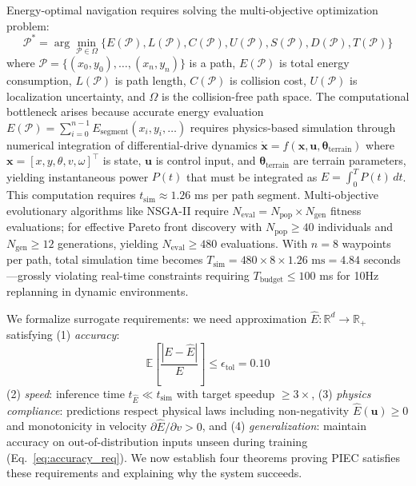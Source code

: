 \documentclass[pdflatex,sn-nature]{sn-jnl}%
\begin{document}
Energy-optimal navigation requires solving the multi-objective optimization problem:
\begin{equation}
\mathcal{P}^* = \arg\min_{\mathcal{P} \in \Omega} \{ E(\mathcal{P}), L(\mathcal{P}), C(\mathcal{P}), U(\mathcal{P}), S(\mathcal{P}), D(\mathcal{P}), T(\mathcal{P}) \}
\label{eq:multiobjective_problem}
\end{equation}
where $\mathcal{P} = \{(x_0,y_0), \ldots, (x_n,y_n)\}$ is a path, $E(\mathcal{P})$ is total energy consumption, $L(\mathcal{P})$ is path length, $C(\mathcal{P})$ is collision cost, $U(\mathcal{P})$ is localization uncertainty, and $\Omega$ is the collision-free path space. The computational bottleneck arises because accurate energy evaluation $E(\mathcal{P}) = \sum_{i=0}^{n-1} E_{\text{segment}}(x_i, y_i, \ldots)$ requires physics-based simulation through numerical integration of differential-drive dynamics $\dot{\mathbf{x}} = f(\mathbf{x}, \mathbf{u}, \boldsymbol{\theta}_{\text{terrain}})$ where $\mathbf{x} = [x, y, \theta, v, \omega]^\top$ is state, $\mathbf{u}$ is control input, and $\boldsymbol{\theta}_{\text{terrain}}$ are terrain parameters, yielding instantaneous power $P(t)$ that must be integrated as $E = \int_0^T P(t) \, dt$. This computation requires $t_{\text{sim}} \approx 1.26$ ms per path segment. Multi-objective evolutionary algorithms like NSGA-II require $N_{\text{eval}} = N_{\text{pop}} \times N_{\text{gen}}$ fitness evaluations; for effective Pareto front discovery with $N_{\text{pop}} \geq 40$ individuals and $N_{\text{gen}} \geq 12$ generations, yielding $N_{\text{eval}} \geq 480$ evaluations. With $n=8$ waypoints per path, total simulation time becomes $T_{\text{sim}} = 480 \times 8 \times 1.26 \text{ ms} = 4.84$ seconds—grossly violating real-time constraints requiring $T_{\text{budget}} \leq 100$ ms for 10Hz replanning in dynamic environments.

We formalize surrogate requirements: we need approximation $\hat{E}: \mathbb{R}^d \to \mathbb{R}_+$ satisfying (1) \textit{accuracy}:
\begin{equation}
\mathbb{E}\left[\frac{|E - \hat{E}|}{E}\right] \leq \epsilon_{\text{tol}} = 0.10
\label{eq:accuracy_req}
\end{equation}
(2) \textit{speed}: inference time $t_{\hat{E}} \ll t_{\text{sim}}$ with target speedup $\geq 3\times$, (3) \textit{physics compliance}: predictions respect physical laws including non-negativity $\hat{E}(\mathbf{u}) \geq 0$ and monotonicity in velocity $\partial\hat{E}/\partial v > 0$, and (4) \textit{generalization}: maintain accuracy on out-of-distribution inputs unseen during training (Eq.~\ref{eq:accuracy_req}). We now establish four theorems proving PIEC satisfies these requirements and explaining why the system succeeds.
\end{document}
